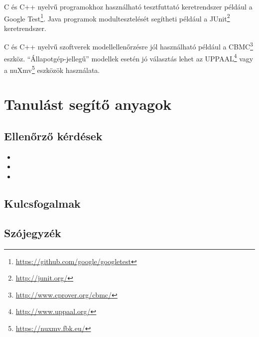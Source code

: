 C és C++ nyelvű programokhoz használható tesztfuttató keretrendszer például a Google Test\footnote{\url{https://github.com/google/googletest}}. Java programok modultesztelését segítheti például a JUnit\footnote{\url{http://junit.org/}} keretrendszer.

C és C++ nyelvű szoftverek modellellenőrzésre jól használható például a CBMC\footnote{\url{http://www.cprover.org/cbmc/}} eszköz. ``Állapotgép-jellegű'' modellek esetén jó választás lehet az UPPAAL\footnote{\url{http://www.uppaal.org/}} vagy a nuXmv\footnote{\url{https://nuxmv.fbk.eu/}} eszközök használata.

\section{Tanulást segítő anyagok}

\subsection{Ellenőrző kérdések}
\begin{itemize}
	\item 
	\item
	\item
\end{itemize}

\subsection{Kulcsfogalmak}

\subsection{Szójegyzék}